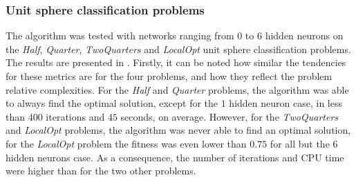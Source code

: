 \subsubsection{Unit sphere classification problems}

The algorithm was tested with networks ranging from $0$ to $6$ hidden neurons on the \textit{Half}, \textit{Quarter}, \textit{TwoQuarters} and \textit{LocalOpt} unit sphere classification problems.
The results are presented in . Firstly, it can be noted how similar the tendencies for these metrics are for the four problems, and how they reflect the problem relative
complexities. For the \textit{Half} and \textit{Quarter} problems, the algorithm was able to always find the optimal solution, except for the $1$ hidden neuron case, in less than
$400$ iterations and $45$ seconds, on average. However, for the \textit{TwoQuarters} and \textit{LocalOpt} problems, the algorithm was never able to find an optimal solution, for the
\textit{LocalOpt} problem the fitness was even lower than $0.75$ for all but the $6$ hidden neurons case. As a consequence, the number of iterations and CPU time were higher than
for the two other problems.


